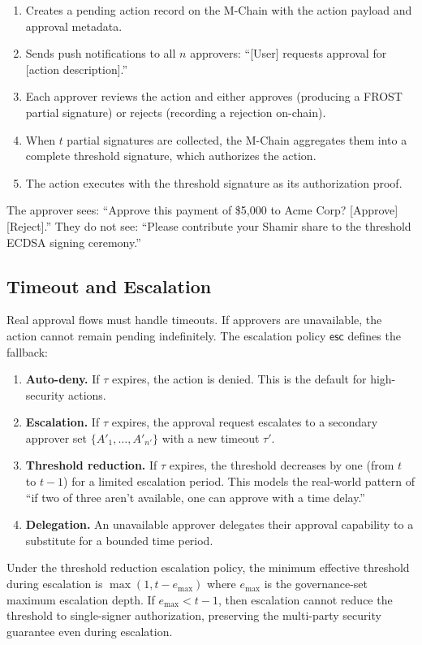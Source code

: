 \begin{enumerate}
    \item Creates a pending action record on the M-Chain with the action
    payload and approval metadata.
    \item Sends push notifications to all $n$ approvers: ``[User] requests
    approval for [action description].''
    \item Each approver reviews the action and either approves (producing
    a FROST partial signature) or rejects (recording a rejection on-chain).
    \item When $t$ partial signatures are collected, the M-Chain aggregates
    them into a complete threshold signature, which authorizes the action.
    \item The action executes with the threshold signature as its
    authorization proof.
\end{enumerate}

The approver sees: ``Approve this payment of \$5,000 to Acme Corp?
[Approve] [Reject].'' They do not see: ``Please contribute your Shamir
share to the threshold ECDSA signing ceremony.''

\subsection{Timeout and Escalation}

Real approval flows must handle timeouts. If approvers are unavailable,
the action cannot remain pending indefinitely. The escalation policy
$\mathsf{esc}$ defines the fallback:

\begin{enumerate}
    \item \textbf{Auto-deny.} If $\tau$ expires, the action is denied.
    This is the default for high-security actions.
    \item \textbf{Escalation.} If $\tau$ expires, the approval request
    escalates to a secondary approver set $\{A'_1, \ldots, A'_{n'}\}$
    with a new timeout $\tau'$.
    \item \textbf{Threshold reduction.} If $\tau$ expires, the threshold
    decreases by one (from $t$ to $t-1$) for a limited escalation period.
    This models the real-world pattern of ``if two of three aren't
    available, one can approve with a time delay.''
    \item \textbf{Delegation.} An unavailable approver delegates their
    approval capability to a substitute for a bounded time period.
\end{enumerate}

\begin{proposition}
Under the threshold reduction escalation policy, the minimum effective
threshold during escalation is $\max(1, t - e_{\max})$ where $e_{\max}$
is the governance-set maximum escalation depth. If $e_{\max} < t - 1$,
then escalation cannot reduce the threshold to single-signer authorization,
preserving the multi-party security guarantee even during escalation.
\end{proposition}

